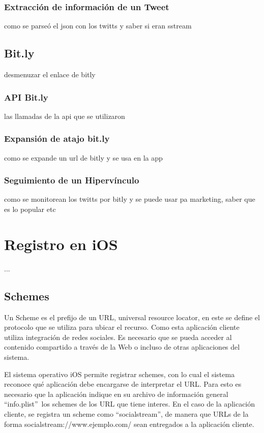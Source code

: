 		\subsubsection{Extracción de información de un Tweet}
		como se parseó el json con los twitts y saber si eran sstream
	\subsection{Bit.ly}
		desmenuzar el enlace de bitly
		\subsubsection{API Bit.ly}
		las llamadas de la api que se utilizaron
		\subsubsection{Expansión de atajo bit.ly}
		como se expande un url de bitly y se usa en la app
		\subsubsection{Seguimiento de un Hipervínculo}		
		como se monitorean los twitts por bitly y se puede usar pa marketing, saber que es lo popular etc		

\clearpage
\section{Registro en iOS}
...
	\subsection{Schemes}
	Un Scheme es el prefijo de un URL, universal resource locator, en este se define el protocolo que se utiliza para ubicar el recurso.
Como esta aplicación cliente utiliza integración de redes sociales. Es necesario que se pueda acceder al contenido compartido a través de la Web o incluso de otras aplicaciones del sistema.

El sistema operativo iOS permite registrar schemes, con lo cual el sistema reconoce qué aplicación debe encargarse de interpretar el URL. Para esto es necesario que la aplicación indique en su archivo de información general \textquotedblleft info.plist\textquotedblright  \ los schemes de los URL que tiene interes.
En el caso de la aplicación cliente, se registra un scheme como \textquotedblleft socialstream\textquotedblright , de manera que URLs de la forma socialstream://www.ejemplo.com/ sean entregados a la aplicación cliente.

